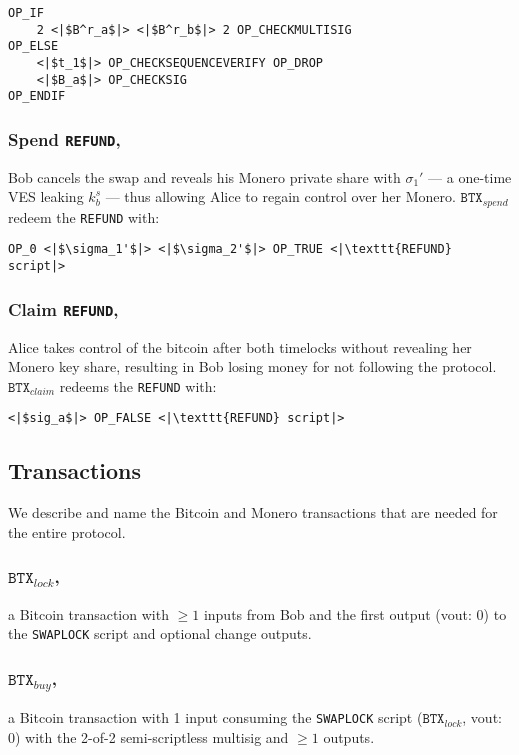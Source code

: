 \documentclass{llncs}
\newcommand{\BTX}{\texttt{BTX}}
\begin{document}
\begin{verbatim}
OP_IF
    2 <|$B^r_a$|> <|$B^r_b$|> 2 OP_CHECKMULTISIG
OP_ELSE
    <|$t_1$|> OP_CHECKSEQUENCEVERIFY OP_DROP
    <|$B_a$|> OP_CHECKSIG
OP_ENDIF
\end{verbatim}

\subsubsection{Spend \texttt{REFUND},}
Bob cancels the swap and reveals his Monero private share with $\sigma_1'$ --- a one-time VES leaking $k^s_b$ --- thus allowing Alice to regain control over her Monero. $\BTX_\textit{spend}$ redeem the \texttt{REFUND} with:

\begin{verbatim}
OP_0 <|$\sigma_1'$|> <|$\sigma_2'$|> OP_TRUE <|\texttt{REFUND} script|>
\end{verbatim}

\subsubsection{Claim \texttt{REFUND},}
Alice takes control of the bitcoin after both timelocks without revealing her Monero key share, resulting in Bob losing money for not following the protocol. $\BTX_\textit{claim}$ redeems the \texttt{REFUND} with:

\begin{verbatim}
<|$sig_a$|> OP_FALSE <|\texttt{REFUND} script|>
\end{verbatim}

\subsection{Transactions}
We describe and name the Bitcoin and Monero transactions that are needed for the entire protocol.

\subsubsection{$\BTX_\textit{lock}$,}
a Bitcoin transaction with $\geq 1$ inputs from Bob and the first output (vout: 0) to the \texttt{SWAPLOCK} script and optional change outputs.

\subsubsection{$\BTX_\textit{buy}$,}
a Bitcoin transaction with 1 input consuming the \texttt{SWAPLOCK} script ($\BTX_\textit{lock}$, vout: 0) with the 2-of-2 semi-scriptless multisig and $\geq 1$ outputs.
\end{document}
